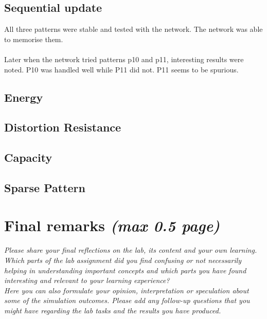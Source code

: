 \documentclass[a4paper]{article}
\begin{document}
\subsection{Sequential update}
All three patterns were stable and tested with the network. The network was able to memorise them. \\
\\Later when the network tried patterns p10 and p11, interesting results were noted. P10 was handled well while P11 did not. P11 seems to be spurious. \\

\subsection{Energy}


\subsection{Distortion Resistance}

\subsection{Capacity}

\subsection{Sparse Pattern}

\section{Final remarks \normalsize{\textit{(max 0.5 page)}}}
\textit{Please share your final reflections on the lab, its content and your own learning. Which parts of the lab assignment did you find confusing or not necessarily helping in understanding important concepts and which parts you have found interesting and relevant to your learning experience? \\
Here you can also formulate your opinion, interpretation or speculation about some of the simulation outcomes. Please add any follow-up questions that you might have regarding the lab tasks and the results you have produced.}
\end{document}
